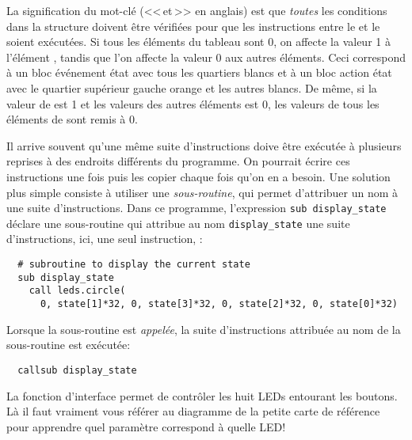 La signification du mot-clé  (<<\,et\,>> en anglais) est que \emph{toutes} les conditions dans 
la structure  doivent être vérifiées pour que les instructions entre le
 et le  soient exécutées.
Si tous les éléments du tableau  sont 0, on affecte la valeur 1 à l'élément ,
tandis que l'on affecte la valeur 0 aux autres éléments.
Ceci correspond à un bloc événement état avec tous les quartiers blancs
et à un bloc action état avec le quartier supérieur gauche orange et les autres blancs.
De même, si la valeur de  est 1 et les valeurs des autres éléments est 0,
les valeurs de tous les éléments de  sont remis à 0.

\newpage


Il arrive souvent qu'une même suite d'instructions doive être exécutée à plusieurs reprises
à des endroits différents du programme.
On pourrait écrire ces instructions une fois puis les copier chaque fois qu'on en a besoin.
Une solution plus simple consiste à utiliser une \emph{sous-routine}, qui permet
d'attribuer un nom à une suite d'instructions.
Dans ce programme, l'expression {\footnotesize\verb+sub display_state+} déclare une
sous-routine qui attribue au nom {\footnotesize\verb+display_state+} une suite d'instructions,
ici, une seul instruction, :

\bigskip

\begin{footnotesize}
\begin{verbatim}
  # subroutine to display the current state
  sub display_state
    call leds.circle(
      0, state[1]*32, 0, state[3]*32, 0, state[2]*32, 0, state[0]*32)
\end{verbatim}
\end{footnotesize}

Lorsque la sous-routine est \emph{appelée}, la suite d'instructions attribuée au nom de la sous-routine
est exécutée:
\vspace{-1ex}
\begin{footnotesize}
\begin{verbatim}
  callsub display_state
\end{verbatim}
\end{footnotesize}
\vspace{-1ex}
La fonction d'interface  permet de contrôler les huit LEDs entourant les boutons.
Là il faut vraiment vous référer au diagramme de la petite carte de référence pour apprendre
quel paramètre correspond à quelle LED!


